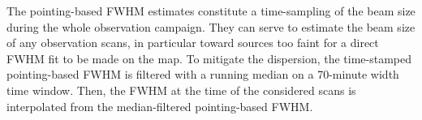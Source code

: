 %
%
The pointing-based FWHM estimates constitute a time-sampling of the
beam size during
the whole observation campaign. They can serve to estimate the beam
size of any observation scans, in particular
toward sources too faint for a direct FWHM %
fit to be made on the map. To mitigate the dispersion, the time-stamped
pointing-based FWHM
is filtered with a running median on a 70-minute
width time window. Then, the FWHM %
at the time of the considered scans is
interpolated from the median-filtered pointing-based FWHM.%
%
